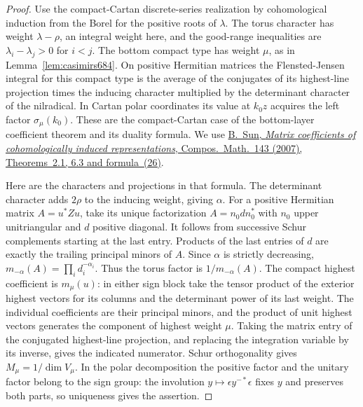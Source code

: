 \documentclass[a4paper,11pt]{article}
\theoremstyle{definition}
\theoremstyle{remark}
\numberwithin{equation}{section}
\begin{document}
\begin{proof}
Use the compact-Cartan discrete-series realization by
cohomological induction from the Borel for the positive
roots of \(\lambda\). The torus character has weight
\(\lambda-\rho\), an integral weight here, and the good-range
inequalities are \(\lambda_i-\lambda_j>0\) for \(i<j\).
The bottom compact type has weight \(\mu\), as in
Lemma~\ref{lem:casimirs684}. On positive Hermitian matrices
the Flensted-Jensen integral for this compact type is the
average of the conjugates of its highest-line projection
times the inducing character multiplied by the determinant
character of the nilradical. In Cartan polar coordinates its
value at \(k_0z\) acquires the left factor \(\sigma_\mu(k_0)\).
These are the compact-Cartan case of the bottom-layer
coefficient theorem and its duality formula. We use
\href{https://doi.org/10.1112/S0010437X06002508}{B.~Sun,
\emph{Matrix coefficients of cohomologically induced representations},
Compos.~Math.~143 (2007), Theorems~2.1, 6.3 and formula~(26)}.

Here are the characters and projections in that formula.
The determinant character adds \(2\rho\) to the inducing
weight, giving \(\alpha\). For a positive Hermitian matrix
\(A=u^*Zu\), take its unique factorization \(A=n_0 d n_0^*\)
with \(n_0\) upper unitriangular and \(d\) positive diagonal.
It follows from successive Schur complements starting at the
last entry. Products of the last entries of \(d\) are exactly
the trailing principal minors of \(A\). Since \(\alpha\) is
strictly decreasing, \(m_{-\alpha}(A)=\prod_i d_i^{-\alpha_i}\).
Thus the torus factor is \(1/m_{-\alpha}(A)\). The compact
highest coefficient is \(m_\mu(u)\): in either sign block take
the tensor product of the exterior highest vectors for its
columns and the determinant power of its last weight.
The individual coefficients are their principal minors, and
the product of unit highest vectors generates the component
of highest weight \(\mu\). Taking the matrix entry of the
conjugated highest-line projection, and replacing the
integration variable by its inverse, gives the indicated
numerator. Schur orthogonality gives \(M_\mu=1/\dim V_\mu\).
In the polar decomposition the positive factor and the unitary
factor belong to the sign group: the involution
\(y\mapsto\epsilon y^{-*}\epsilon\) fixes \(y\) and preserves
both parts, so uniqueness gives the assertion.


\end{proof}
\end{document}
